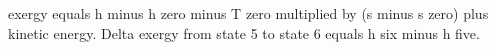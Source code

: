 exergy equals h minus h zero minus T zero multiplied by (s minus s zero) plus kinetic energy.  
Delta exergy from state 5 to state 6 equals h six minus h five.
